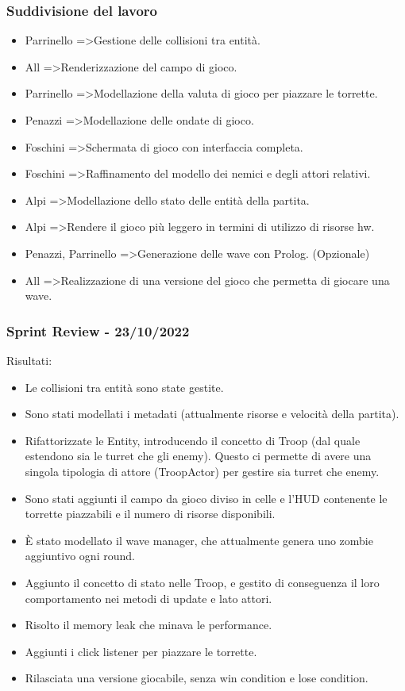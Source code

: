 \subsubsection{Suddivisione del lavoro}
\begin{itemize}
    \item Parrinello =\textgreater  Gestione delle collisioni tra entità.
    \item All =\textgreater  Renderizzazione del campo di gioco.
    \item Parrinello =\textgreater  Modellazione della valuta di gioco per piazzare le torrette.
    \item Penazzi =\textgreater  Modellazione delle ondate di gioco.
    \item Foschini =\textgreater  Schermata di gioco con interfaccia completa.
    \item Foschini =\textgreater  Raffinamento del modello dei nemici e degli attori relativi.
    \item Alpi =\textgreater  Modellazione dello stato delle entità della partita.
    \item Alpi =\textgreater  Rendere il gioco più leggero in termini di utilizzo di risorse hw.
    \item Penazzi, Parrinello =\textgreater  Generazione delle wave con Prolog. (Opzionale)
    \item All =\textgreater  Realizzazione di una versione del gioco che permetta di giocare una wave.
\end{itemize}

\subsubsection{Sprint Review - 23/10/2022}
Risultati:
\begin{itemize}
  \item Le collisioni tra entità sono state gestite.
  \item Sono stati modellati i metadati (attualmente risorse e velocità della partita).
  \item Rifattorizzate le Entity, introducendo il concetto di Troop (dal quale estendono sia le turret che gli enemy).
        Questo ci permette di avere una singola tipologia di attore (TroopActor) per gestire sia turret che enemy.
  \item Sono stati aggiunti il campo da gioco diviso in celle e l'HUD contenente le torrette piazzabili e il numero di risorse disponibili.
  \item È stato modellato il wave manager, che attualmente genera uno zombie aggiuntivo ogni round.
  \item Aggiunto il concetto di stato nelle Troop, e gestito di conseguenza il loro comportamento nei metodi di update e lato attori.
  \item Risolto il memory leak che minava le performance.
  \item Aggiunti i click listener per piazzare le torrette.
  \item Rilasciata una versione giocabile, senza win condition e lose condition.
\end{itemize}

